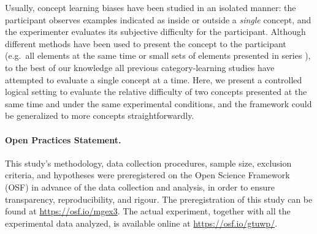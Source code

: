 Usually, concept learning biases have been studied in an isolated manner: the participant observes examples indicated as inside or outside a \textit{single} concept, and the experimenter evaluates its subjective difficulty for the participant. Although different methods have been used to present the concept to the participant (e.g.\ all elements at the same time \cite{tano2020towards,kemp2012exploring} or small sets of elements presented in series \cite{piantadosi2016logical}), to the best of our knowledge all previous category-learning studies have attempted to evaluate a single concept at a time. Here, we present a controlled logical setting to evaluate the relative difficulty of two concepts presented at the same time and under the same experimental conditions, and the framework could be generalized to more concepts straightforwardly. 



% 

\paragraph{Open Practices Statement.} This study's methodology, data collection procedures, sample size, exclusion criteria, and hypotheses were preregistered on the Open Science Framework (OSF) in advance of the data collection and analysis, in order to ensure transparency, reproducibility, and rigour. The preregistration of this study can be found at \url{https://osf.io/mgex3}. The actual experiment, together with all the experimental data analyzed, is available online at \url{https://osf.io/gtuwp/}.